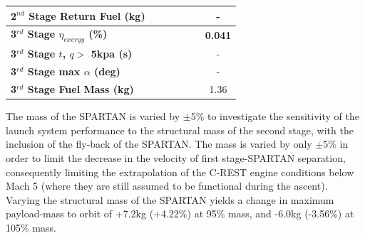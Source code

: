 \begin{table}[ht]
\begin{tabular}{l c c c c c c}
	\\
	\textbf{2$^{nd}$ Stage Return Fuel (kg)}
	& \returnFuelmSPARTANNinetyFive
	& \returnFuelmSPARTANNinetySevenFive
	& \returnFuelmSPARTANStandard
	& \returnFuelmSPARTANOneHundredTwoFive
	& \returnFuelmSPARTANOneHundredFive
	& -
	\\
	\hline 
	\textbf{3$^{rd}$ Stage $\eta_{exergy}$ (\%)}
	& \textbf{\thirddExergyEffmSPARTANNinetyFive}
	& \textbf{\thirddExergyEffmSPARTANNinetySevenFive}
	& \textbf{\thirddExergyEffmSPARTANStandard}
	& \textbf{\thirddExergyEffmSPARTANOneHundredTwoFive}
	& \textbf{\thirddExergyEffmSPARTANOneHundredFive}
	& \textbf{0.041}
	\\
	\textbf{3$^{rd}$ Stage $t$, $q >$ 5kpa (s)}
	& \thirdqOverFivemSPARTANNinetyFive
	& \thirdqOverFivemSPARTANNinetySevenFive
	& \thirdqOverFivemSPARTANStandard
	& \thirdqOverFivemSPARTANOneHundredTwoFive
	& \thirdqOverFivemSPARTANOneHundredFive
	& -
	\\
	\textbf{3$^{rd}$ Stage max $\alpha$ (deg)}
	& \thirdmaxAoAmSPARTANNinetyFive
	& \thirdmaxAoAmSPARTANNinetySevenFive
	& \thirdmaxAoAmSPARTANStandard
	& \thirdmaxAoAmSPARTANOneHundredTwoFive
	& \thirdmaxAoAmSPARTANOneHundredFive
	& -
	\\
	\textbf{3$^{rd}$ Stage Fuel Mass (kg)}
	& \thirdmFuelmSPARTANNinetyFive
	& \thirdmFuelmSPARTANNinetySevenFive
	& \thirdmFuelmSPARTANStandard
	& \thirdmFuelmSPARTANOneHundredTwoFive
	& \thirdmFuelmSPARTANOneHundredFive
	&1.36
	\\
	\hline 
\end{tabular}

\end{table}


The mass of the SPARTAN is varied by $\pm$5\% to investigate the sensitivity of the launch system performance to the structural mass of the second stage, with the inclusion of the fly-back of the SPARTAN. The mass is varied by only $\pm$5\% in order to limit the decrease in the velocity of first stage-SPARTAN separation, consequently limiting the extrapolation of the C-REST engine conditions below Mach 5 (where they are still assumed to be functional during the ascent).
Varying the structural mass of the SPARTAN yields a change in maximum payload-mass to orbit of +7.2kg (+4.22\%) at 95\% mass, and -6.0kg (-3.56\%) at 105\% mass. 

